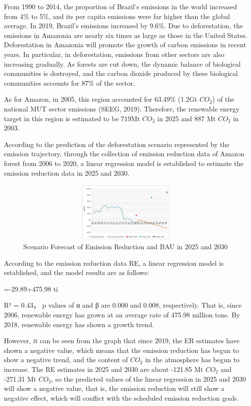 \documentclass{apmcmthesis}
\begin{document}
From 1990 to 2014, the proportion of Brazil's emissions in the world increased from 4$\%$ to 5$\%$, and its per capita emissions were far higher than the global average. In 2019, Brazil's emissions increased by 9.6$\%$. Due to deforestation, the emissions in Amazonia are nearly six times as large as those in the United States. Deforestation in Amazonia will promote the growth of carbon emissions in recent years. In particular, in deforestation, emissions from other sectors are also increasing gradually. As forests are cut down, the dynamic balance of biological communities is destroyed, and the carbon dioxide produced by these biological communities accounts for 87$\%$ of the sector.

As for Amazon, in 2005, this region accounted for 63.49$\%$ (1.2Gt $CO_2$) of the national MUT sector emissions (SEEG, 2019). Therefore, the renewable energy target in this region is estimated to be 719Mt $CO_2$ in 2025 and 887 Mt $CO_2$ in 2003.

According to the prediction of the deforestation scenario represented by the emission trajectory, through the collection of emission reduction data of Amazon forest from 2006 to 2020, a linear regression model is established to estimate the emission reduction data in 2025 and 2030.

 \begin{figure} 
    \centering
    \includegraphics[width=13cm,height=3cm]{APMCMThesis/figures/tu2.png}
    \caption{Scenario Forecast of Emission Reduction and BAU in 2025 and 2030}
\label{recuction}
\end{figure}

According to the emission reduction data RE, a linear regression model is established, and the model results are as follows:

=-29.89+475.98 ti

 R² =  0.43， p values of α and β are 0.000 and 0.008, respectively. That is, since 2006, renewable energy has grown at an average rate of 475.98 million tons. By 2018, renewable energy has shown a growth trend.


However, it can be seen from the graph that since 2019, the ER estimates have shown a negative value, which means that the emission reduction has begun to show a negative trend, and the content of $CO_2$ in the atmosphere has begun to increase. The RE estimates in 2025 and 2030 are about -121.85 Mt $CO_2$ and -271.31 Mt $CO_2$, so the predicted values of the linear regression in 2025 and 2030 will show a negative value, that is, the emission reduction will still show a negative effect, which will conflict with the scheduled emission reduction goals.
\end{document}
